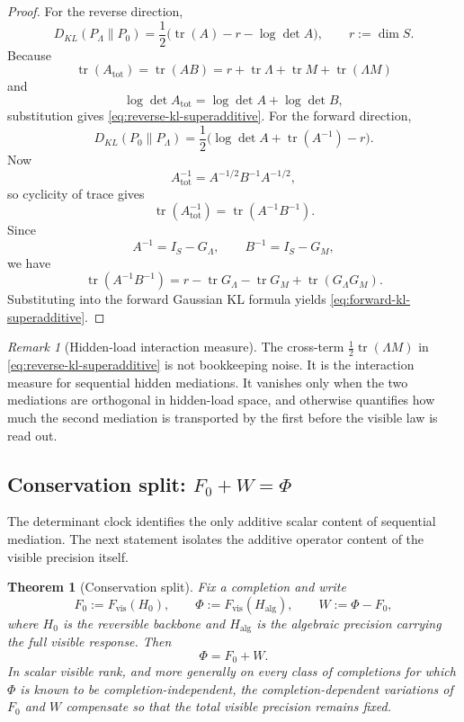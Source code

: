\documentclass[11pt]{article}
\numberwithin{equation}{section}
\theoremstyle{thmcompact}
\newtheorem{theorem}{Theorem}[section]
\theoremstyle{remark}
\newtheorem*{remarkplain}{Remark}
\newenvironment{remark}[1][]%
{\begin{remarkbox}\begin{remarkplain}[#1]\normalfont}
		{\end{remarkplain}\end{remarkbox}}
\begin{document}
\begin{proof}
For the reverse direction,
\[
D_{KL}(P_\Lambda\|P_0)=\frac12\bigl(\operatorname{tr}(A)-r-\log\det A\bigr),
\qquad r:=\dim S.
\]
Because
\[
\operatorname{tr}(A_{\mathrm{tot}})=\operatorname{tr}(AB)=r+\operatorname{tr}\Lambda+\operatorname{tr}M+\operatorname{tr}(\Lambda M)
\]
and
\[
\log\det A_{\mathrm{tot}}=\log\det A+\log\det B,
\]
substitution gives \eqref{eq:reverse-kl-superadditive}. For the forward direction,
\[
D_{KL}(P_0\|P_\Lambda)=\frac12\bigl(\log\det A+\operatorname{tr}(A^{-1})-r\bigr).
\]
Now
\[
A_{\mathrm{tot}}^{-1}=A^{-1/2}B^{-1}A^{-1/2},
\]
so cyclicity of trace gives
\[
\operatorname{tr}(A_{\mathrm{tot}}^{-1})=\operatorname{tr}(A^{-1}B^{-1}).
\]
Since
\[
A^{-1}=I_S-G_\Lambda,
\qquad
B^{-1}=I_S-G_M,
\]
we have
\[
\operatorname{tr}(A^{-1}B^{-1})=r-\operatorname{tr}G_\Lambda-\operatorname{tr}G_M+\operatorname{tr}(G_\Lambda G_M).
\]
Substituting into the forward Gaussian KL formula yields \eqref{eq:forward-kl-superadditive}.
\end{proof}

\begin{remark}[Hidden-load interaction measure]
The cross-term $\tfrac12\operatorname{tr}(\Lambda M)$ in \eqref{eq:reverse-kl-superadditive} is not bookkeeping noise. It is the interaction measure for sequential hidden mediations. It vanishes only when the two mediations are orthogonal in hidden-load space, and otherwise quantifies how much the second mediation is transported by the first before the visible law is read out.
\end{remark}

\subsection{Conservation split: $F_0 + W = \Phi$}

The determinant clock identifies the only additive scalar content of sequential mediation. The next statement isolates the additive operator content of the visible precision itself.

\begin{theorem}[Conservation split]\label{thm:conservation-split}
Fix a completion and write
\begin{equation}\label{eq:conservation-defs}
F_0 := F_{\mathrm{vis}}(H_0),
\qquad
\Phi := F_{\mathrm{vis}}(H_{\mathrm{alg}}),
\qquad
W := \Phi - F_0,
\end{equation}
where $H_0$ is the reversible backbone and $H_{\mathrm{alg}}$ is the algebraic precision carrying the full visible response. Then
\begin{equation}\label{eq:conservation-split}
\Phi = F_0 + W.
\end{equation}
In scalar visible rank, and more generally on every class of completions for which $\Phi$ is known to be completion-independent, the completion-dependent variations of $F_0$ and $W$ compensate so that the total visible precision remains fixed.
\end{theorem}
\end{document}
